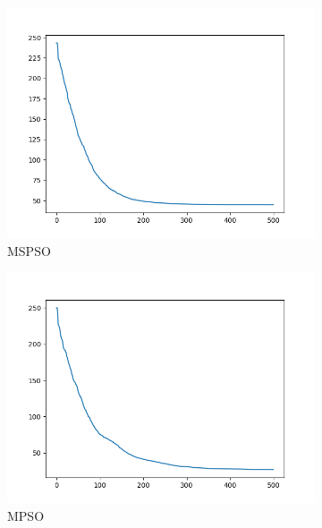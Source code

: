 \documentclass[12pt]{article}
\begin{document}
\begin{figure}[H]
    \centering
    \begin{subfigure}{0.32\textwidth}
        \centering
        \includegraphics[width=\linewidth]{plots/MSPSO/rastrigin.png}
        \caption{MSPSO}
    \end{subfigure}
    \begin{subfigure}{0.32\textwidth}
        \centering
        \includegraphics[width=\linewidth]{plots/MPSO/rastrigin.png}
        \caption{MPSO}
    \end{subfigure}
    \begin{subfigure}{0.32\textwidth}
        \centering

\end{subfigure}
\end{figure}
\end{document}
